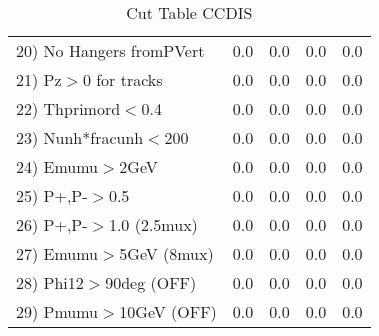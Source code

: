 \begin{table}[h!]
\begin{tabular}{||l||r|r|r|r||}
 20) No Hangers fromPVert &         0.0 &         0.0 &         0.0 &         0.0 \\
 21) Pz$>$0 for tracks    &         0.0 &         0.0 &         0.0 &         0.0 \\
 22) Thprimord$<$0.4      &         0.0 &         0.0 &         0.0 &         0.0 \\
 23) Nunh*fracunh$<$200   &         0.0 &         0.0 &         0.0 &         0.0 \\
 24) Emumu$>$2GeV         &         0.0 &         0.0 &         0.0 &         0.0 \\
 25) P+,P-$>$0.5          &         0.0 &         0.0 &         0.0 &         0.0 \\
 26) P+,P-$>$1.0 (2.5mux) &         0.0 &         0.0 &         0.0 &         0.0 \\
 27) Emumu$>$5GeV  (8mux) &         0.0 &         0.0 &         0.0 &         0.0 \\
 28) Phi12$>$90deg  (OFF) &         0.0 &         0.0 &         0.0 &         0.0 \\
 29) Pmumu$>$10GeV  (OFF) &         0.0 &         0.0 &         0.0 &         0.0 \\
 \hline
 \hline
 \end{tabular}
 \caption{Cut Table  CCDIS  }
 \label{tab-cut_ccdis}
 \end{table}
